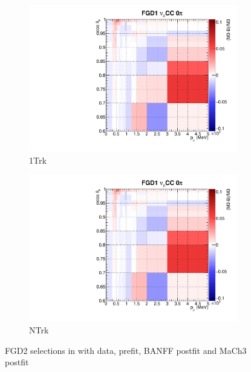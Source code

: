 \begin{figure}
\begin{subfigure}[t]{0.24\textwidth}
		\includegraphics[width=\textwidth, trim={0mm 0mm 10mm 7mm}, clip, page=39]{figures/mach3/banff/postfit_comp}
		\caption{\numu 1Trk}
	\end{subfigure}
	\begin{subfigure}[t]{0.24\textwidth}
		\includegraphics[width=\textwidth, trim={0mm 0mm 10mm 7mm}, clip, page=42]{figures/mach3/banff/postfit_comp}
		\caption{\numu NTrk}
	\end{subfigure}
	\caption{FGD2 selections in \pmu with data, prefit, BANFF postfit and MaCh3 postfit}
	\label{fig:mach3_banff_postfit_fgd2}
\end{figure}

